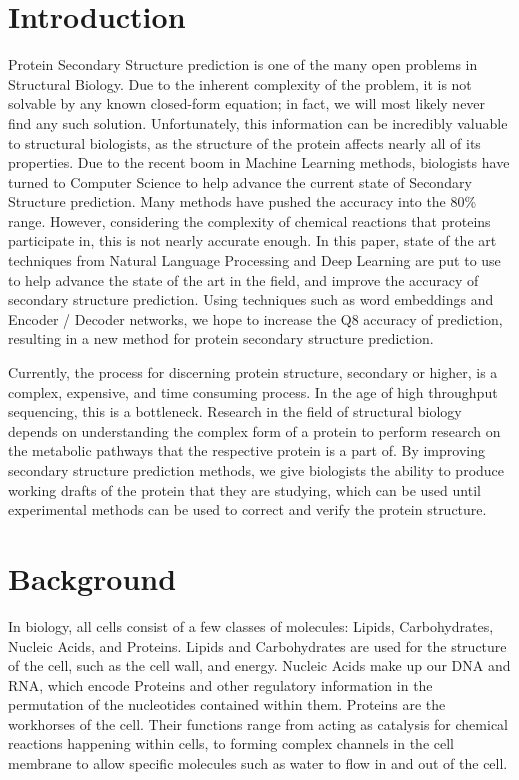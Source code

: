 \documentclass[pageno]{jpaper}
\begin{document}
\section{Introduction}
Protein Secondary Structure prediction is one of the many open problems in Structural Biology.  Due to the inherent complexity of the problem, it is not solvable by any known closed-form equation; in fact, we will most likely never find any such solution.  Unfortunately, this information can be incredibly valuable to structural biologists, as the structure of the protein affects nearly all of its properties.  Due to the recent boom in Machine Learning methods, biologists have turned to Computer Science to help advance the current state of Secondary Structure prediction.  Many methods have pushed the accuracy into the 80\% range.  However, considering the complexity of chemical reactions that proteins participate in, this is not nearly accurate enough.  In this paper, state of the art techniques from Natural Language Processing and Deep Learning are put to use to help advance the state of the art in the field, and improve the accuracy of secondary structure prediction.  Using techniques such as word embeddings and Encoder / Decoder networks, we hope to increase the Q8 accuracy of prediction, resulting in a new method for protein secondary structure prediction.

\par
Currently, the process for discerning protein structure, secondary or higher, is a complex, expensive, and time consuming process.  In the age of high throughput sequencing, this is a bottleneck.  Research in the field of structural biology depends on understanding the complex form of a protein to perform research on the metabolic pathways that the respective protein is a part of.  By improving secondary structure prediction methods, we give biologists the ability to produce working drafts of the protein that they are studying, which can be used until experimental methods can be used to correct and verify the protein structure.

\section{Background}
In biology, all cells consist of a few classes of molecules: Lipids, Carbohydrates, Nucleic Acids, and Proteins.  Lipids and Carbohydrates are used for the structure of the cell, such as the cell wall, and energy.  Nucleic Acids make up our DNA and RNA, which encode Proteins and other regulatory information in the permutation of the nucleotides contained within them.  Proteins are the workhorses of the cell.  Their functions range from acting as catalysis for chemical reactions happening within cells, to forming complex channels in the cell membrane to allow specific molecules such as water to flow in and out of the cell.
\end{document}
